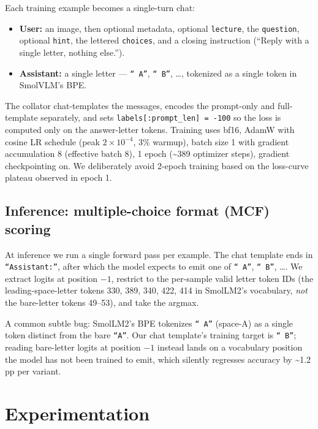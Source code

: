 \documentclass[11pt]{article}
\begin{document}
Each training example becomes a single-turn chat:

\begin{itemize}
    \item \textbf{User:} an image, then optional metadata, optional \texttt{lecture}, the \texttt{question}, optional \texttt{hint}, the lettered \texttt{choices}, and a closing instruction (``Reply with a single letter, nothing else.'').
    \item \textbf{Assistant:} a single letter --- \texttt{`` A''}, \texttt{`` B''}, \ldots, tokenized as a single token in SmolVLM's BPE.
\end{itemize}

The collator chat-templates the messages, encodes the prompt-only and full-template separately, and sets \texttt{labels[:prompt\_len] = -100} so the loss is computed only on the answer-letter tokens. Training uses bf16, AdamW with cosine LR schedule (peak $2\!\times\!10^{-4}$, 3\% warmup), batch size 1 with gradient accumulation 8 (effective batch 8), 1 epoch (\textasciitilde 389 optimizer steps), gradient checkpointing on. We deliberately avoid 2-epoch training based on the loss-curve plateau observed in epoch 1.

\subsection{Inference: multiple-choice format (MCF) scoring}

At inference we run a single forward pass per example. The chat template ends in \texttt{``Assistant:''}, after which the model expects to emit one of \texttt{`` A''}, \texttt{`` B''}, \ldots. We extract logits at position $-1$, restrict to the per-sample valid letter token IDs (the leading-space-letter tokens 330, 389, 340, 422, 414 in SmolLM2's vocabulary, \textit{not} the bare-letter tokens 49--53), and take the argmax.

A common subtle bug: SmolLM2's BPE tokenizes \texttt{`` A''} (space-A) as a single token distinct from the bare \texttt{``A''}. Our chat template's training target is \texttt{`` B''}; reading bare-letter logits at position $-1$ instead lands on a vocabulary position the model has not been trained to emit, which silently regresses accuracy by \textasciitilde 1.2 pp per variant.

\section{Experimentation}
\label{sec:experiments}
\end{document}
